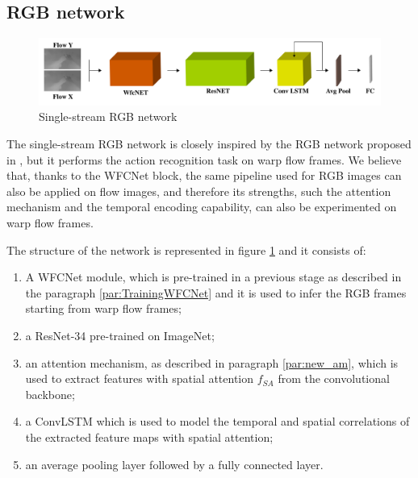 \documentclass[10pt,twocolumn,letterpaper]{article}
\begin{document}
\subsection{RGB network}
\label{par:our_rgb_network}

\begin{figure}
	\begin{center}
		\includegraphics[width=\textwidth]{schemi/single_stream_img.pdf}		
	\end{center}
	\caption{Single-stream RGB network}
	\label{fig:SingleStream}
\end{figure}

The single-stream RGB network is closely inspired by the RGB network proposed in \cite{Ego-RNN}, but it performs the action recognition task on warp flow frames.
We believe that, thanks to the WFCNet block, the same pipeline used for RGB images can also be applied on flow images, and therefore its strengths, such the attention mechanism and the temporal encoding capability, can also be experimented on warp flow frames. 

The structure of the network is represented in figure \ref{fig:SingleStream} and it consists of:
\begin{enumerate}
	\item A WFCNet module, which is pre-trained in a previous stage as described in the paragraph \ref{par:TrainingWFCNet} and it is used to infer the RGB frames starting from warp flow frames;
	\item a ResNet-34 pre-trained on ImageNet;
	\item an attention mechanism, as described in paragraph \ref{par:new_am}, which is used to extract features with spatial attention $f_{SA}$ from the convolutional backbone;
	\item a ConvLSTM which is used to model the temporal and spatial correlations of the extracted feature maps with spatial attention;
	\item an average pooling layer followed by a fully connected layer.
\end{enumerate}
\end{document}
